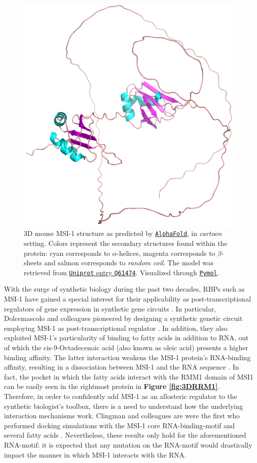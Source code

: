 \begin{figure}[htbp!]
    \centering
    \includegraphics[width=0.5\linewidth]{assets/MSI1_complete.png}
    \caption[3D mouse MSI-1 structure as predicted by \texttt{AlphaFold}.]{3D mouse MSI-1 structure as predicted by \href{https://alphafold.ebi.ac.uk/}{\texttt{AlphaFold}}, in \textit{cartoon} setting. Colors represent the secondary structures found within the protein: cyan corresponds to $\alpha$-helices, magenta corresponds to $\beta$-sheets and salmon corresponds to \textit{random coil}. The model was retrieved from \href{https://www.uniprot.org/uniprotkb/Q61474/entry}{\texttt{Uniprot} entry \texttt{Q61474}}. Visualized through \href{https://pymol.org/2/}{\texttt{Pymol}}.}
    \label{fig:3DMSI} 
\end{figure}

With the surge of synthetic biology during the past two decades, RBPs such as MSI-1 have gained a special interest for their applicability as post-transcriptional regulators of gene expression in synthetic gene circuits \cite{belmont_2010,cao_2015,katz_2019}. In particular, Dolcemascolo and colleagues pioneered by designing a synthetic genetic circuit employing MSI-1 as post-transcriptional regulator \cite{dolcemascolo_2022}. In addition, they also exploited MSI-1's particularity of binding to fatty acids in addition to RNA, out of which the cis-9-Octadecenoic acid (also known as oleic acid) presents a higher binding affinity. The latter interaction weakens the MSI-1 protein's RNA-binding affinity, resulting in a dissociation between MSI-1 and the RNA sequence \cite{dolcemascolo_2022,clingman_2014}. In fact, the pocket in which the fatty acids interact with the RMM1 domain of MSI1 can be easily seen in the rightmost protein in \textbf{Figure \ref{fig:3DRRM1}}.\\

Therefore, in order to confidently add MSI-1 as an allosteric regulator to the synthetic biologist's toolbox, there is a need to understand how the underlying interaction mechanisms work. Clingman and colleagues are were the first who performed docking simulations with the MSI-1 core RNA-binding-motif and several fatty acids \cite{clingman_2014}. Nevertheless, these results only hold for the aforementioned RNA-motif: it is expected that any mutation on the RNA-motif would drastically impact the manner in which MSI-1 interacts with the RNA.

